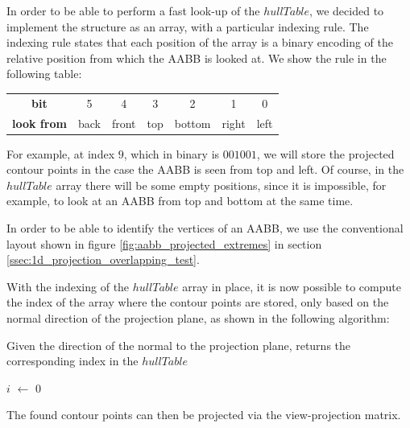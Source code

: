 \documentclass{PoliMi_MasterThesis}
\newcommand*\Let[2]{\State #1 $\gets$ #2}
\begin{document}
In order to be able to perform a fast look-up of the $hullTable$, we decided to implement the structure as an array, with a particular indexing rule. The indexing rule states that each position of the array is a binary encoding of the relative position from which the AABB is looked at. We show the rule in the following table:

\begin{tabular}{| c | c | c | c | c | c | c |}
	\hline
	\textbf{bit} & 5 & 4 & 3 & 2 & 1 & 0 \\
	\textbf{look from} & back & front & top & bottom & right & left \\
	\hline
\end{tabular}

For example, at index $9$, which in binary is $001001$, we will store the projected contour points in the case the AABB is seen from top and left. Of course, in the $hullTable$ array there will be some empty positions, since it is impossible, for example, to look at an AABB from top and bottom at the same time.

In order to be able to identify the vertices of an AABB, we use the conventional layout shown in figure \ref{fig:aabb_projected_extremes} in section \ref{ssec:1d_projection_overlapping_test}.

With the indexing of the $hullTable$ array in place, it is now possible to compute the index of the array where the contour points are stored, only based on the normal direction of the projection plane, as shown in the following algorithm:

\begin{algorithm}[H]
	\caption{Given the direction of the normal to the projection plane, returns the corresponding index in the $hullTable$}
	\begin{algorithmic}[1]
		\Let{$i$}{0}
		\State{$\textbf{if}\; dir.x > 0 \; \textbf{then} \; i |= 1$}
		\State {}
		\EndFunction
	\end{algorithmic}
\end{algorithm} 

The found contour points can then be projected via the view-projection matrix.
\end{document}

